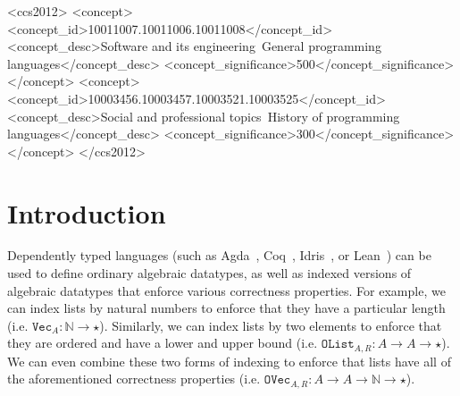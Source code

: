\documentclass[acmsmall]{acmart}\settopmatter{}
\newcommand{\txt}[1]{\ensuremath{\texttt{#1}}}
\newcommand{\arr}[0]{\ensuremath{\rightarrow}}
\newcommand{\nat}[0]{\ensuremath{\mathbb{N}}}
\begin{document}
\begin{CCSXML}
<ccs2012>
<concept>
<concept_id>10011007.10011006.10011008</concept_id>
<concept_desc>Software and its engineering~General programming languages</concept_desc>
<concept_significance>500</concept_significance>
</concept>
<concept>
<concept_id>10003456.10003457.10003521.10003525</concept_id>
<concept_desc>Social and professional topics~History of programming languages</concept_desc>
<concept_significance>300</concept_significance>
</concept>
</ccs2012>
\end{CCSXML}





\maketitle

\section{Introduction}

Dependently typed languages
(such as Agda~\cite{lang:agda}, Coq~\cite{lang:coq},
Idris~\cite{lang:idris}, or Lean~\cite{lang:lean}) can be used to
define ordinary algebraic datatypes, as well as indexed versions of
algebraic datatypes that enforce various correctness properties.
For example, we can index lists by natural numbers to
enforce that they have a particular length
(i.e. \texttt{$\txt{Vec}_A : \nat \arr \star $}).
Similarly, we can index lists by two elements to
enforce that they are ordered and have a lower and upper bound
(i.e. \texttt{$\txt{OList}_{A,R} : A \arr A \arr \star $}).
We can even combine these two forms of indexing to
enforce that lists have all of the aforementioned correctness properties
(i.e. \texttt{$\txt{OVec}_{A,R} : A \arr A \arr \nat \arr \star$}).
\end{document}
